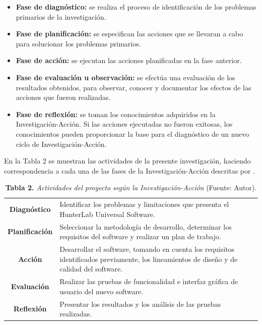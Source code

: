 	\begin{itemize}
		\item \textbf{Fase de diagn\'{o}stico:} se realiza el proceso de identificaci\'{o}n de los problemas primarios de la investigaci\'{o}n.
		\item \textbf{Fase de planificaci\'{o}n:} se especifican las acciones que se llevaran a cabo para solucionar los problemas primarios.
		\item \textbf{Fase de acci\'{o}n:} se ejecutan las acciones planificadas en la fase anterior.
		\item \textbf{Fase de evaluaci\'{o}n u observaci\'{o}n:} se efect\'{u}a una evaluaci\'{o}n de los resultados obtenidos, para observar, conocer y documentar los efectos de las acciones que fueron realizadas.
		\item \textbf{Fase de reflexi\'{o}n:} se toman los conocimientos adquiridos en la Investigaci\'{o}n-Acci\'{o}n. Si las acciones ejecutadas no fueron exitosas, los conocimientos pueden proporcionar la base para el diagn\'{o}stico de un nuevo ciclo de Investigaci\'{o}n-Acci\'{o}n.
	\end{itemize}

En la Tabla 2 se muestran las actividades de la presente investigaci\'{o}n, haciendo correspondencia a cada una de las fases de la Investigaci\'{o}n-Acci\'{o}n descritas por \cite{Baskerville}.

\FloatBarrier %
	\begin{table}[htb]
		\small
		\caption{\textbf{Tabla 2.} \textit{Actividades del proyecto seg\'{u}n la Investigaci\'{o}n-Acci\'{o}n} (Fuente: Autor).}
		\centering
		\setlength{\extrarowheight}{\altocelda}
		\begin{tabulary}{\anchotabla}{|c|J|}
			\hline
			 & \\ \hline
			\textbf{Diagn\'{o}stico} & Identificar los problemas y limitaciones que presenta el HunterLab Universal Software.\\ \hline
			\textbf{Planificaci\'{o}n} & Seleccionar la metodolog\'{i}a de desarrollo, determinar los requisitos del software y realizar un plan de trabajo.
\\ \hline
			\textbf{Acci\'{o}n} & Desarrollar el software, tomando en cuenta los requisitos identificados previamente, los lineamientos de dise\~{n}o y de calidad del software.\\ \hline
			\textbf{Evaluaci\'{o}n} & Realizar las pruebas de funcionalidad e interfaz gr\'{a}fica de usuario del nuevo software.\\ \hline
			\textbf{Reflexi\'{o}n} & Presentar los resultados y los an\'{a}lisis de las pruebas realizadas.\\ \hline
		\end{tabulary}
	\end{table}
\FloatBarrier %

